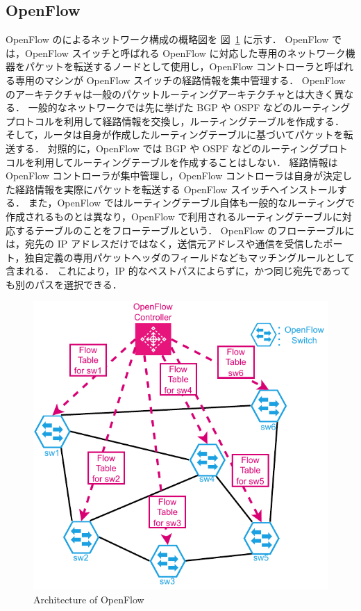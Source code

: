 \subsection*{OpenFlow}
\label{sbsection:openflow}
OpenFlow のによるネットワーク構成の概略図を 図~\ref{fig:openflow} に示す．
OpenFlow では，OpenFlow スイッチと呼ばれる OpenFlow に対応した専用のネットワーク機器をパケットを転送するノードとして使用し，OpenFlow コントローラと呼ばれる専用のマシンが OpenFlow スイッチの経路情報を集中管理する．
OpenFlow のアーキテクチャは一般のパケットルーティングアーキテクチャとは大きく異なる．
一般的なネットワークでは先に挙げた BGP や OSPF などのルーティングプロトコルを利用して経路情報を交換し，ルーティングテーブルを作成する．
そして，ルータは自身が作成したルーティングテーブルに基づいてパケットを転送する．
対照的に，OpenFlow では BGP や OSPF などのルーティングプロトコルを利用してルーティングテーブルを作成することはしない．
経路情報は OpenFlow コントローラが集中管理し，OpenFlow コントローラは自身が決定した経路情報を実際にパケットを転送する OpenFlow スイッチへインストールする．
また，OpenFlow ではルーティングテーブル自体も一般的なルーティングで作成されるものとは異なり，OpenFlow で利用されるルーティングテーブルに対応するテーブルのことをフローテーブルという．
OpenFlow のフローテーブルには，宛先の IP アドレスだけではなく，送信元アドレスや通信を受信したポート，独自定義の専用パケットヘッダのフィールドなどもマッチングルールとして含まれる．
これにより，IP 的なベストパスによらずに，かつ同じ宛先であっても別のパスを選択できる．

\begin{figure}[t]
    \centering
    \includegraphics[width=0.95\linewidth]{img/OpenFlow.pdf}
    \caption{Architecture of OpenFlow}
    \label{fig:openflow}
\end{figure}

